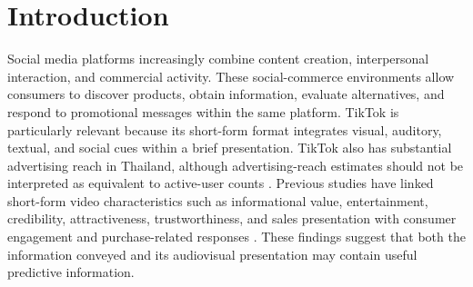 \documentclass[jtaer,article,submit,moreauthors]{Definitions/mdpi}
\begin{document}

\section{Introduction}

Social media platforms increasingly combine content creation, interpersonal
interaction, and commercial activity. These social-commerce environments
allow consumers to discover products, obtain information, evaluate
alternatives, and respond to promotional messages within the same platform.
TikTok is particularly relevant because its short-form format integrates
visual, auditory, textual, and social cues within a brief presentation.
TikTok also has substantial advertising reach in Thailand, although
advertising-reach estimates should not be interpreted as equivalent to
active-user counts \cite{Kemp2024}. Previous studies have linked short-form
video characteristics such as informational value, entertainment,
credibility, attractiveness, trustworthiness, and sales presentation with
consumer engagement and purchase-related responses
\cite{Xiao2023,Meng2024,Shen2024,Luo2025}. These findings suggest that both
the information conveyed and its audiovisual presentation may contain useful
predictive information.
\end{document}
